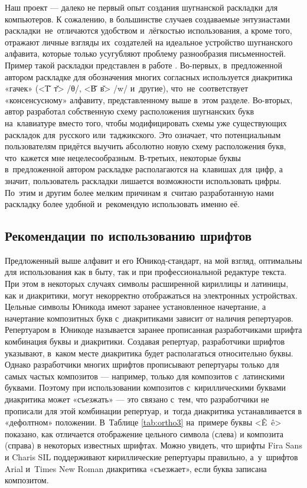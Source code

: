 Наш проект — далеко не первый опыт создания шугнанской раскладки для компьютеров. К сожалению, в большинстве случаев создаваемые энтузиастами раскладки~не~отличаются удобством и~лёгкостью использования, а кроме того, отражают личные взгляды их~создателей на идеальное устройство шугнанского алфавита, которые только усугубляют проблему разнообразия письменностей. Пример такой раскладки представлен в работе \parencite[21–30]{gulomsafdarov2020}. Во-первых, в~предложенной автором раскладке для обозначения многих согласных используется диакритика «гачек» (<Т̌~т̌> /θ/, <В̌~в̌> /w/ и~другие), что~не~соответствует «консенсусному» алфавиту, представленному выше в~этом разделе. Во-вторых, автор разработал собственную схему расположения шугнанских букв на~клавиатуре вместо того, чтобы модифицировать схемы уже существующих раскладок для~русского или~таджикского. Это означает, что потенциальным пользователям придётся выучить абсолютно новую схему расположения букв, что~кажется мне нецелесообразным. В-третьих, некоторые буквы в~предложенной автором раскладке располагаются на~клавишах для~цифр, а значит, пользователь раскладки лишается возможности использовать цифры. По~этим и другим более мелким причинам я~считаю разработанную нами раскладку более удобной и~рекомендую использовать именно её.

\subsection{Рекомендации по использованию шрифтов} \label{ortho-fonts}

Предложенный выше алфавит и его Юникод-стандарт, на мой взгляд, оптимальны для использования как в быту, так и при профессиональной редактуре текста. При этом в некоторых случаях символы расширенной кириллицы и латиницы, как и диакритики, могут некорректно отображаться на электронных устройствах. Цельные символы Юникода имеют заранее установленное начертание, а начертание композитных букв с~диакритиками зависит от наличия репертуаров. Репертуаром в~Юникоде называется заранее прописанная разработчиками шрифта комбинация буквы и диакритики. Создавая репертуар, разработчики шрифтов указывают, в~каком месте диакритика будет располагаться относительно буквы. Однако разработчики многих шрифтов прописывают репертуары только для самых частых композитов — например, только для композитов с~латинскими буквами. Поэтому при использовании композитов с~кириллическими буквами диакритика может «съезжать» — это связано с~тем, что разработчики не прописали для этой комбинации репертуар, и~тогда диакритика устанавливается в «дефолтном» положении. В~Таблице \ref{tab:ortho3} на~примере буквы <Ê~ê> показано, как отличается отображение цельного символа (слева) и композита (справа) в некоторых известных шрифтах. Можно увидеть, что шрифты Fira Sans и Charis SIL поддерживают кириллические репертуары правильно, а~у~шрифтов Arial и~Times New Roman диакритика «съезжает», если буква записана композитом.

